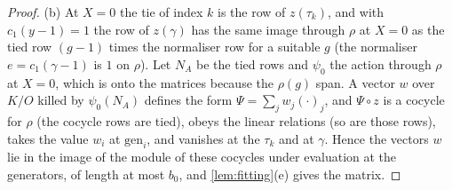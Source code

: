 \begin{proof}
(b) At $X=0$ the tie of index $k$ is the row of $z(\tau_k)$, and with $c_1(y-1)=1$ the row of $z(\gamma)$ has the same image through $\rho$ at $X=0$ as the tied row $(g-1)$ times the normaliser row for a suitable $g$ (the normaliser
$e=c_1(\gamma-1)$ is $1$ on $\rho$). Let $N_A$ be the tied rows and $\psi_0$ the action through $\rho$ at $X=0$, which is onto the matrices because the $\rho(g)$ span. A vector $w$ over $K/O$ killed by $\psi_0(N_A)$ defines the form
$\Psi=\sum_jw_j(\cdot)_j$, and $\Psi\circ z$ is a cocycle for $\rho$ (the cocycle rows are tied), obeys the linear relations (so are those rows), takes the value $w_i$ at $\mathrm{gen}_i$, and vanishes at the $\tau_k$ and at $\gamma$. Hence the
vectors $w$ lie in the image of the module of these cocycles under evaluation at the generators, of length at most $b_0$, and \cref{lem:fitting}(e) gives the matrix.


\end{proof}
